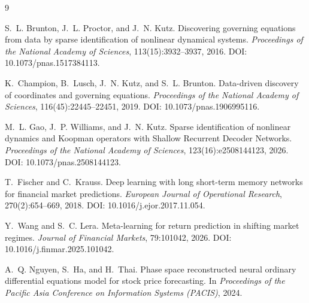 \documentclass{article}
\begin{document}
\begin{thebibliography}{9}
\small

S.~L. Brunton, J.~L. Proctor, and J.~N. Kutz.
\newblock Discovering governing equations from data by sparse identification of nonlinear dynamical systems.
\newblock \emph{Proceedings of the National Academy of Sciences}, 113(15):3932--3937, 2016.
\newblock DOI: 10.1073/pnas.1517384113.

K.~Champion, B.~Lusch, J.~N. Kutz, and S.~L. Brunton.
\newblock Data-driven discovery of coordinates and governing equations.
\newblock \emph{Proceedings of the National Academy of Sciences}, 116(45):22445--22451, 2019.
\newblock DOI: 10.1073/pnas.1906995116.

M.~L. Gao, J.~P. Williams, and J.~N. Kutz.
\newblock Sparse identification of nonlinear dynamics and Koopman operators with Shallow Recurrent Decoder Networks.
\newblock \emph{Proceedings of the National Academy of Sciences}, 123(16):e2508144123, 2026.
\newblock DOI: 10.1073/pnas.2508144123.

T.~Fischer and C.~Krauss.
\newblock Deep learning with long short-term memory networks for financial market predictions.
\newblock \emph{European Journal of Operational Research}, 270(2):654--669, 2018.
\newblock DOI: 10.1016/j.ejor.2017.11.054.

Y.~Wang and S.~C. Lera.
\newblock Meta-learning for return prediction in shifting market regimes.
\newblock \emph{Journal of Financial Markets}, 79:101042, 2026.
\newblock DOI: 10.1016/j.finmar.2025.101042.

A.~Q. Nguyen, S.~Ha, and H.~Thai.
\newblock Phase space reconstructed neural ordinary differential equations model for stock price forecasting.
\newblock In \emph{Proceedings of the Pacific Asia Conference on Information Systems (PACIS)}, 2024.

\end{thebibliography}
\end{document}
